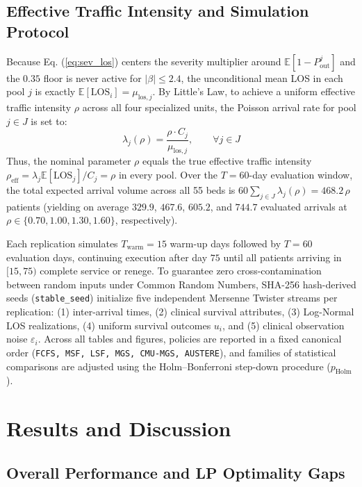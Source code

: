 \documentclass[final,5p,times,twocolumn]{elsarticle}
\begin{document}
\subsection{Effective Traffic Intensity and Simulation Protocol}

Because Eq. (\ref{eq:sev_los}) centers the severity multiplier around $\mathbb{E}[1 - P_{\text{out}}^j]$ and the $0.35$ floor is never active for $|\beta| \le 2.4$, the unconditional mean LOS in each pool $j$ is exactly $\mathbb{E}[\text{LOS}_i] = \mu_{\text{los}, j}$. By Little's Law, to achieve a uniform effective traffic intensity $\rho$ across all four specialized units, the Poisson arrival rate for pool $j \in J$ is set to:
\begin{equation}
    \lambda_j(\rho) = \frac{\rho \cdot C_j}{\mu_{\text{los}, j}}, \qquad \forall j \in J
    \label{eq:traffic_intensity}
\end{equation}
Thus, the nominal parameter $\rho$ equals the true effective traffic intensity $\rho_{\text{eff}} = \lambda_j \mathbb{E}[\text{LOS}_j]/C_j = \rho$ in every pool. Over the $T = 60$-day evaluation window, the total expected arrival volume across all 55 beds is $60 \sum_{j \in J} \lambda_j(\rho) = 468.2\,\rho$ patients (yielding on average $329.9$, $467.6$, $605.2$, and $744.7$ evaluated arrivals at $\rho \in \{0.70, 1.00, 1.30, 1.60\}$, respectively).

Each replication simulates $T_{\text{warm}} = 15$ warm-up days followed by $T = 60$ evaluation days, continuing execution after day $75$ until all patients arriving in $[15, 75)$ complete service or renege. To guarantee zero cross-contamination between random inputs under Common Random Numbers, SHA-256 hash-derived seeds (\texttt{stable\_seed}) initialize five independent Mersenne Twister streams per replication: (1) inter-arrival times, (2) clinical survival attributes, (3) Log-Normal LOS realizations, (4) uniform survival outcomes $u_i$, and (5) clinical observation noise $\varepsilon_i$. Across all tables and figures, policies are reported in a fixed canonical order (\texttt{FCFS, MSF, LSF, MGS, CMU-MGS, AUSTERE}), and families of statistical comparisons are adjusted using the Holm--Bonferroni step-down procedure ($p_{\text{Holm}}$).

\section{Results and Discussion}
\label{sec:results}

\subsection{Overall Performance and LP Optimality Gaps}
\end{document}
